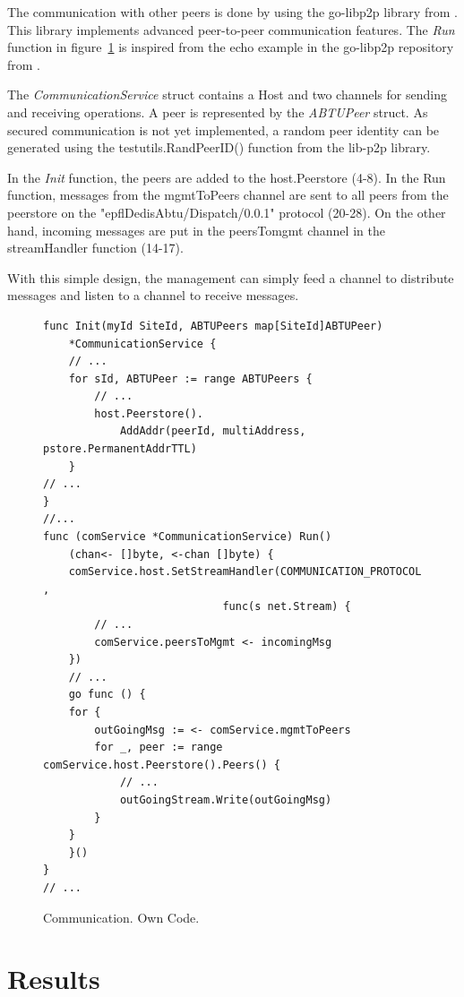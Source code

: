 \documentclass[11pt, a4paper, oneside, openright]{article} %
\begin{document}
The communication with other peers is done by using the go-libp2p library from \cite{libp2p}. This library implements advanced peer-to-peer communication features. The \textit{Run} function in figure~\ref{code:com} is inspired from the echo example in the go-libp2p repository from \cite{libp2p}.

The \textit{CommunicationService} struct contains a Host and two channels for sending and receiving operations. A peer is represented by the \textit{ABTUPeer} struct. As secured communication is not yet implemented, a random peer identity can be generated using the testutils.RandPeerID() function from the lib-p2p library.

In the \textit{Init} function, the peers are added to the host.Peerstore (4-8). In the Run function, messages from the mgmtToPeers channel are sent to all peers from the peerstore on the "epflDedisAbtu/Dispatch/0.0.1" protocol (20-28). On the other hand, incoming messages are put in the peersTomgmt channel in the streamHandler function (14-17).

With this simple design, the management can simply feed a channel to distribute messages and listen to a channel to receive messages.

\begin{figure}[!h]
\begin{center}
\begin{lstlisting}
func Init(myId SiteId, ABTUPeers map[SiteId]ABTUPeer)
	*CommunicationService {
	// ...
	for sId, ABTUPeer := range ABTUPeers {
		// ...
		host.Peerstore().
			AddAddr(peerId, multiAddress, pstore.PermanentAddrTTL)
	}
// ...
}
//...
func (comService *CommunicationService) Run()
	(chan<- []byte, <-chan []byte) {
	comService.host.SetStreamHandler(COMMUNICATION_PROTOCOL ,
							func(s net.Stream) {
		// ...
		comService.peersToMgmt <- incomingMsg
	})
	// ...
	go func () {
	for {
		outGoingMsg := <- comService.mgmtToPeers
		for _, peer := range comService.host.Peerstore().Peers() {
			// ...
			outGoingStream.Write(outGoingMsg)
		}
	}
	}()
}
// ...

\end{lstlisting}
\end{center}
\caption{Communication. Own Code.\label{code:com}}
\end{figure}

\section{Results}
\end{document}
